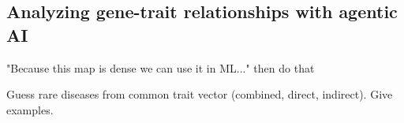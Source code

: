 
\subsection{Analyzing gene-trait relationships with agentic AI}

"Because this map is dense we can use it in ML..." then do that

Guess rare diseases from common trait vector (combined, direct, indirect). Give examples.
